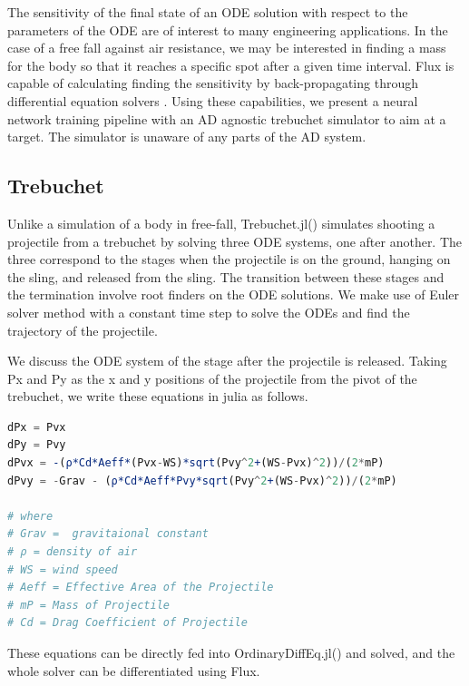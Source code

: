 \documentclass{juliacon}
\begin{document}
The sensitivity of the final state of an ODE solution with respect to the parameters of the ODE are of interest to many engineering applications. In the case of a free fall against air resistance, we may be interested in finding a mass for the body so that it reaches a specific spot after a given time interval. Flux is capable of calculating finding the sensitivity by back-propagating through differential equation solvers \cite{DBLP:journals/corr/abs-1902-02376}. Using these capabilities, we present a neural network training pipeline with an AD agnostic trebuchet simulator to aim at a target. The simulator is unaware of any parts of the AD system.

\subsection{Trebuchet}


Unlike a simulation of a body in free-fall, Trebuchet.jl(\cite{Trebuchet.jl}) simulates shooting a projectile from a trebuchet by solving three ODE systems{\cite{TrebuchetEquations}}, one after another. The three correspond to the stages when the projectile is on the ground, hanging on the sling, and released from the sling. The transition between these stages and the termination involve root finders on the ODE solutions. We make use of Euler solver method with a constant time step to solve the ODEs and find the trajectory of the projectile. 

We discuss the ODE system of the stage after the projectile is released. Taking Px and Py as the x and y positions of the projectile from the pivot of the trebuchet, we write these equations in julia as follows. 

\begin{lstlisting}[caption={Equations after releasing projectile},
        label = {lst:example_ode},
        captionpos = b,
        language = Julia]
dPx = Pvx
dPy = Pvy
dPvx = -(ρ*Cd*Aeff*(Pvx-WS)*sqrt(Pvy^2+(WS-Pvx)^2))/(2*mP)
dPvy = -Grav - (ρ*Cd*Aeff*Pvy*sqrt(Pvy^2+(WS-Pvx)^2))/(2*mP)
    
# where 
# Grav =  gravitaional constant
# ρ = density of air
# WS = wind speed
# Aeff = Effective Area of the Projectile
# mP = Mass of Projectile
# Cd = Drag Coefficient of Projectile    
\end{lstlisting}

These equations can be directly fed into OrdinaryDiffEq.jl(\cite{DifferentialEquations.jl-2017}) and solved, and the whole solver can be differentiated using Flux.
\end{document}
